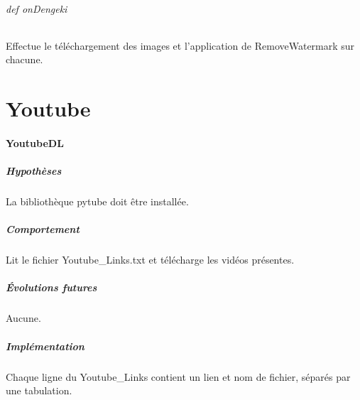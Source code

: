 \documentclass[a4paper,12pt]{article}
\begin{document}
\paragraph{def onDengeki}
Effectue le téléchargement des images et l'application de RemoveWatermark sur chacune.
\part{Youtube}
\subsection{YoutubeDL}
\subsubsection{Hypothèses}
La bibliothèque pytube doit être installée.
\subsubsection{Comportement}
Lit le fichier Youtube\_Links.txt et télécharge les vidéos présentes.
\subsubsection{Évolutions futures}
Aucune.
\subsubsection{Implémentation}
Chaque ligne du Youtube\_Links contient un lien et nom de fichier, séparés par une tabulation. 
\end{document}
